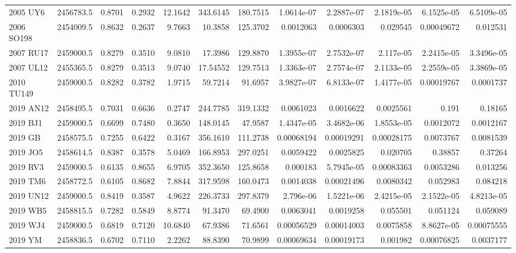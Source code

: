 \documentclass[letters,a4paper,fleqn,usenatbib]{mnras}
\begin{document}
\begin{table*}
{\begin{tabular}{lccrrrrrrrrr}
    2005 UY6   & 2456783.5 & 0.8701 & 0.2932 & 12.1642 & 343.6145 & 180.7515 & 1.0614e-07 & 2.2887e-07 & 2.1819e-05 & 6.1525e-05 & 6.5109e-05 \\ 
    2006 SO198 & 2454009.5 & 0.8632 & 0.2637 & 9.7663 & 10.3858 & 125.3702 & 0.0012063  & 0.0006303  & 0.029545   & 0.00049672 & 0.012531   \\ 
    2007 RU17  & 2459000.5 & 0.8279 & 0.3510 & 9.0810 & 17.3986 & 129.8870 & 1.3955e-07 & 2.7532e-07 & 2.117e-05  & 2.2415e-05 & 3.3496e-05 \\ 
    2007 UL12  & 2455365.5 & 0.8279 & 0.3513 & 9.0740 & 17.54552 & 129.7513 & 1.3363e-07 & 2.7574e-07 & 2.1133e-05 & 2.2559e-05 & 3.3869e-05 \\ 
    2010 TU149 & 2459000.5 & 0.8282 & 0.3782 & 1.9715 & 59.7214 & 91.6957 & 3.9827e-07 & 6.8133e-07 & 1.4177e-05 & 0.00019767 & 0.0001737  \\ 
    2019 AN12  & 2458495.5 & 0.7031 & 0.6636 & 0.2747 & 244.7785 & 319.1332 & 0.0061023  & 0.0016622  & 0.0025561  & 0.191      & 0.18165    \\ 
    2019 BJ1   & 2459000.5 & 0.6699 & 0.7480 & 0.3650 & 148.0145 & 47.9587 & 1.4347e-05 & 3.4682e-06 & 1.8553e-05 & 0.0012072  & 0.0012167  \\ 
    2019 GB    & 2458575.5 & 0.7255 & 0.6422 & 0.3167 & 356.1610 & 111.2738 & 0.00068194 & 0.00019291 & 0.00028175 & 0.0073767  & 0.0081539  \\ 
    2019 JO5   & 2458614.5 & 0.8387 & 0.3578 & 5.0469 & 166.8953 & 297.0251 & 0.0059422  & 0.0025825  & 0.020705   & 0.38857    & 0.37264    \\ 
    2019 RV3   & 2459000.5 & 0.6135 & 0.8655 & 6.9705 & 352.3650 & 125.8658 & 0.000183   & 5.7945e-05 & 0.00083363 & 0.0053286  & 0.013256   \\ 
    2019 TM6   & 2458772.5 & 0.6105 & 0.8682 & 7.8844 & 317.9598 & 160.0473 & 0.0014038  & 0.00021496 & 0.0080342  & 0.052983   & 0.084218   \\ 
    2019 UN12  & 2459000.5 & 0.8419 & 0.3587 & 4.9622 & 226.3733 & 297.8379 & 2.796e-06  & 1.5221e-06 & 2.4215e-05 & 2.1522e-05 & 4.8213e-05 \\ 
    2019 WB5   & 2458815.5 & 0.7282 & 0.5849 & 8.8774 & 91.3470 & 69.4900  & 0.0063041  & 0.0019258  & 0.055501   & 0.051124   & 0.059089   \\ 
    2019 WJ4   & 2459000.5 & 0.6819 & 0.7120 & 10.6840 & 67.9386 & 71.6561  & 0.00056529 & 0.00014003 & 0.0075858  & 8.8627e-05 & 0.00075555 \\ 
    2019 YM    & 2458836.5 & 0.6702 & 0.7110 & 2.2262 & 88.8390 & 70.9899  & 0.00069634 & 0.00019173 & 0.001982   & 0.00076825 & 0.0037177  \\ 

\end{tabular}}
\end{table*}
\end{document}
